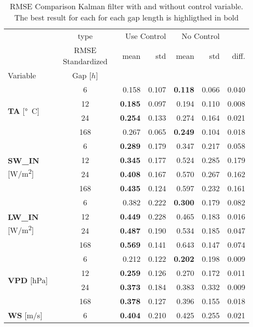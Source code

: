\begin{table}
\centering
\caption{RMSE Comparison Kalman filter with and without control variable. The best result for each for each gap length is highligthed in bold}
\label{control}
\begin{tabular}{p{2.1cm}c|rr|rr|r}
\toprule
 & type & \multicolumn{2}{r}{Use Control} & \multicolumn{2}{r}{No Control} &  \\
 & RMSE Standardized & mean & std & mean & std & diff. \\
Variable & Gap [$h$] &  &  &  &  &  \\
\midrule
\multirow[c]{4}{*}{\parbox{2.1cm}{\textbf{TA} [\si{°C}]}} & 6 & 0.158 & 0.107 & \bfseries 0.118 & 0.066 & 0.040 \\
 & 12 & \bfseries 0.185 & 0.097 & 0.194 & 0.110 & 0.008 \\
 & 24 & \bfseries 0.254 & 0.133 & 0.274 & 0.164 & 0.021 \\
 & 168 & 0.267 & 0.065 & \bfseries 0.249 & 0.104 & 0.018 \\
\cline{1-7}
\multirow[c]{4}{*}{\parbox{2.1cm}{\textbf{SW\_IN} [\si{W/m^2}]}} & 6 & \bfseries 0.289 & 0.179 & 0.347 & 0.217 & 0.058 \\
 & 12 & \bfseries 0.345 & 0.177 & 0.524 & 0.285 & 0.179 \\
 & 24 & \bfseries 0.408 & 0.167 & 0.570 & 0.267 & 0.162 \\
 & 168 & \bfseries 0.435 & 0.124 & 0.597 & 0.232 & 0.161 \\
\cline{1-7}
\multirow[c]{4}{*}{\parbox{2.1cm}{\textbf{LW\_IN} [\si{W/m^2}]}} & 6 & 0.382 & 0.222 & \bfseries 0.300 & 0.179 & 0.082 \\
 & 12 & \bfseries 0.449 & 0.228 & 0.465 & 0.183 & 0.016 \\
 & 24 & \bfseries 0.487 & 0.190 & 0.534 & 0.185 & 0.047 \\
 & 168 & \bfseries 0.569 & 0.141 & 0.643 & 0.147 & 0.074 \\
\cline{1-7}
\multirow[c]{4}{*}{\parbox{2.1cm}{\textbf{VPD} [\si{hPa}]}} & 6 & 0.212 & 0.122 & \bfseries 0.202 & 0.198 & 0.009 \\
 & 12 & \bfseries 0.259 & 0.126 & 0.270 & 0.172 & 0.011 \\
 & 24 & \bfseries 0.373 & 0.184 & 0.383 & 0.332 & 0.009 \\
 & 168 & \bfseries 0.378 & 0.127 & 0.396 & 0.155 & 0.018 \\
\cline{1-7}
\multirow[c]{4}{*}{\parbox{2.1cm}{\textbf{WS} [\si{m/s}]}} & 6 & \bfseries 0.404 & 0.210 & 0.425 & 0.255 & 0.021 \\

\end{tabular}
\end{table}
